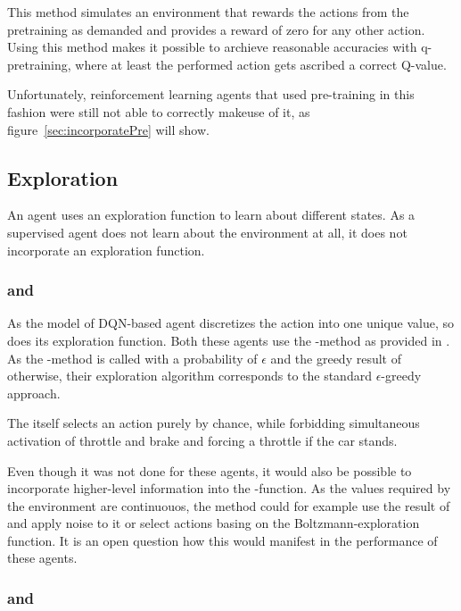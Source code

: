 This method simulates an environment that rewards the actions from the pretraining as demanded and provides a reward of zero for any other action. Using this method makes it possible to archieve reasonable accuracies with q-pretraining, where at least the performed action gets ascribed a correct Q-value. 

Unfortunately, reinforcement learning agents that used pre-training in this fashion were still not able to correctly makeuse of it, as figure~\ref{sec:incorporatePre} will show.

\subsection{Exploration}

An agent uses an exploration function to learn about different states. As a supervised agent does not learn about the environment at all, it does not incorporate an exploration function.

\subsubsection{ and }

As the model of DQN-based agent discretizes the action into one unique value, so does its exploration function. Both these agents use the -method as provided in . As the -method is called with a probability of $\epsilon$ and the greedy result of  otherwise, their exploration algorithm corresponds to the standard $\epsilon$-greedy approach.

The  itself selects an action purely by chance, while forbidding simultaneous activation of throttle and brake and forcing a throttle if the car stands.

Even though it was not done for these agents, it would also be possible to incorporate higher-level information into the -function. As the values required by the environment are continuouos, the method could for example use the result of  and apply noise to it or select actions basing on the Boltzmann-exploration function. It is an open question how this would manifest in the performance of these agents.

\subsubsection{ and }

